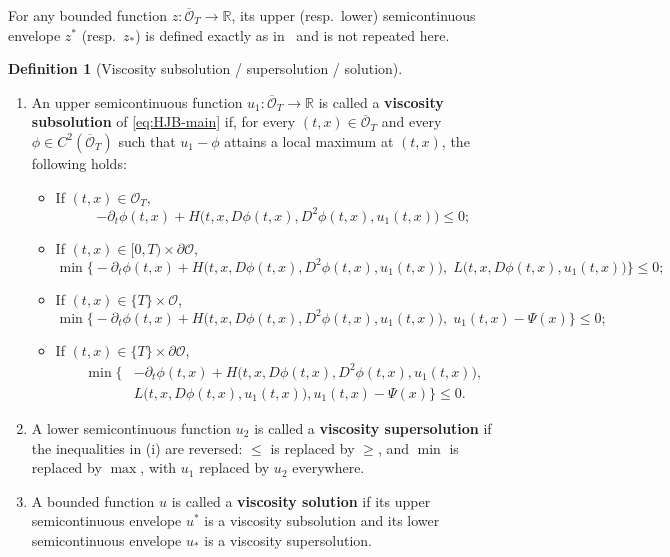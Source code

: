 \documentclass[11pt]{article}
\theoremstyle{definition}
\newtheorem{definition}[theorem]{Definition}
\theoremstyle{remark}
\newcommand{\R}{\mathbb{R}}
\newcommand{\cO}{\mathcal{O}}
\begin{document}
	For any bounded function $z:\overline{\cO}_T\to\R$, its upper (resp.\ lower) semicontinuous envelope $z^*$ (resp.\ $z_*$) is defined exactly as in~\cite{CalzolaEtAl2023} and is not repeated here.
	
	\begin{definition}[Viscosity subsolution / supersolution / solution] \upshape
		\label{def:viscosity}
		\hfill\strut
		\begin{enumerate}
			\item[\upshape(i)] An upper semicontinuous function $u_1:\overline{\cO}_T\to\R$ is called a \textbf{viscosity subsolution} of \eqref{eq:HJB-main} if, for every $(t,x)\in\overline{\cO}_T$ and every $\phi\in C^2(\overline{\cO}_T)$ such that $u_1-\phi$ attains a local maximum at $(t,x)$, the following holds:
			\begin{itemize}
				\item If $(t,x)\in\cO_T$,
				\begin{equation}
					-\partial_t\phi(t,x) + H\big(t,x,D\phi(t,x),D^2\phi(t,x),u_1(t,x)\big) \le 0;
					\label{eq:sub-interior}
				\end{equation}
				\item If $(t,x)\in[0,T)\times\partial\cO$,
				\begin{equation}
					\min\Big\{
					-\partial_t\phi(t,x) + H\big(t,x,D\phi(t,x),D^2\phi(t,x),u_1(t,x)\big),\;
					L\big(t,x,D\phi(t,x),u_1(t,x)\big)
					\Big\} \le 0;
					\label{eq:sub-boundary}
				\end{equation}
				\item If $(t,x)\in\{T\}\times\cO$,
				\begin{equation}
					\min\Big\{
					-\partial_t\phi(t,x) + H\big(t,x,D\phi(t,x),D^2\phi(t,x),u_1(t,x)\big),\;
					u_1(t,x)-\Psi(x)
					\Big\} \le 0;
					\label{eq:sub-terminal-interior}
				\end{equation}
				\item If $(t,x)\in\{T\}\times\partial\cO$,
				\begin{equation}
					\begin{split}
						\min\Big\{
						& -\partial_t\phi(t,x) + H\big(t,x,D\phi(t,x),D^2\phi(t,x),u_1(t,x)\big), \\
						& L\big(t,x,D\phi(t,x),u_1(t,x)\big),  u_1(t,x)-\Psi(x)
						\Big\} \le 0.
					\end{split}
					\label{eq:sub-terminal-boundary}
				\end{equation}
			\end{itemize}
			\item[\upshape(ii)] A lower semicontinuous function $u_2$ is called a \textbf{viscosity supersolution} if the inequalities in (i) are reversed: $\le$ is replaced by $\ge$, and $\min$ is replaced by $\max$, with $u_1$ replaced by $u_2$ everywhere.
			
			
			\item[\upshape(iii)] A bounded function $u$ is called a \textbf{viscosity solution} if its upper semicontinuous envelope $u^*$ is a viscosity subsolution and its lower semicontinuous envelope $u_*$ is a viscosity supersolution.
		\end{enumerate}
	\end{definition}
\end{document}
